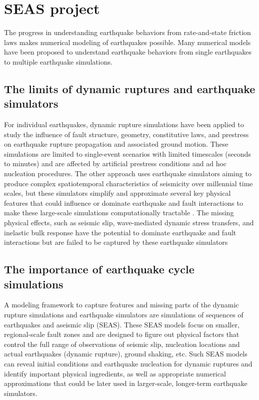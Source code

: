 \section{SEAS project}
The progress in understanding earthquake behaviors from rate-and-state friction laws makes numerical modeling of earthquakes possible. Many numerical models have been proposed to understand earthquake behaviors from single earthquakes to multiple earthquake simulations.

\subsection{The limits of dynamic ruptures and earthquake simulators}
For individual earthquakes, dynamic rupture simulations have been applied to study the influence of fault structure, geometry, constitutive laws, and prestress on earthquake rupture propagation and associated ground motion.
These simulations are limited to single-event scenarios with limited timescales (seconds to minutes) and are affected by artificial prestress conditions and ad hoc nucleation procedures.
The other approach uses earthquake simulators aiming to produce complex spatiotemporal characteristics of seismicity over millennial time scales, but these simulators simplify and approximate several key physical features that could influence or dominate earthquake and fault interactions to make these large-scale simulations computationally tractable \cite{10.1785/0220120093}. 
The missing physical effects, such as seismic slip, wave-mediated dynamic stress transfers, and inelastic bulk response have the potential to dominate earthquake and fault interactions but are failed to be captured by these earthquake simulators

\subsection{The importance of earthquake cycle simulations}
A modeling framework to capture features and missing parts of the dynamic rupture simulations and earthquake simulators are simulations of sequences of earthquakes and aseismic slip (SEAS).
These SEAS models focus on smaller, regional-scale fault zones and are designed to figure out physical factors that control the full range of observations of seismic slip, nucleation locations and actual earthquakes (dynamic rupture), ground shaking, etc.
Such SEAS models can reveal initial conditions and earthquake nucleation for dynamic ruptures and identify important physical ingredients, as well as appropriate numerical approximations that could be later used in larger-scale, longer-term earthquake simulators.

